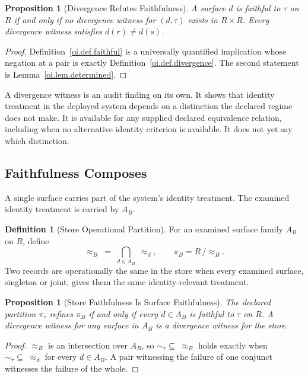 \documentclass[11pt]{article}
\theoremstyle{plain}
\newtheorem{proposition}[theorem]{Proposition}
\theoremstyle{definition}
\newtheorem{definition}[theorem]{Definition}
\theoremstyle{remark}
\newcommand{\Ker}{\ensuremath{\mathrel{\approx_{d}}}}
\begin{document}
\begin{proposition}[Divergence Refutes Faithfulness]
  \label{oi.prop.refutes}
  A surface \(d\) is faithful to \(\tau\) on \(R\)
  if and only if no divergence witness for \((d,\tau)\) exists in \(R\times R\).
  Every divergence witness satisfies \(d(r)\neq d(s)\).
\end{proposition}

\begin{proof}
  Definition~\ref{oi.def.faithful} is a universally quantified implication
  whose negation at a pair is exactly Definition~\ref{oi.def.divergence}.
  The second statement is Lemma~\ref{oi.lem.determined}.
\end{proof}

A divergence witness is an audit finding on its own.
It shows that identity treatment in the deployed system
depends on a distinction the declared regime does not make.
It is available for any supplied declared equivalence relation,
including when no alternative identity criterion is available.
It does not yet say which distinction.

\subsection{Faithfulness Composes}

A single surface carries part of the system's identity treatment.
The examined identity treatment is carried by \(A_B\).

\begin{definition}[Store Operational Partition]
  \label{oi.def.store}
  For an examined surface family \(A_B\) on \(R\), define
  \[
    \approx_{B}
    \;=\;
    \bigcap_{d\in A_B}\;\Ker,
    \qquad
    \pi_B
    =
    R\,/\approx_{B}.
  \]
  Two records are operationally the same in the store
  when every examined surface,
  singleton or joint,
  gives them the same identity-relevant treatment.
\end{definition}

\begin{proposition}[Store Faithfulness Is Surface Faithfulness]
  \label{oi.prop.compose}
  The declared partition \(\pi_{\tau}\) refines \(\pi_B\)
  if and only if every \(d\in A_B\) is faithful to \(\tau\) on \(R\).
  A divergence witness for any surface in \(A_B\)
  is a divergence witness for the store.
\end{proposition}

\begin{proof}
  \(\approx_{B}\) is an intersection over \(A_B\),
  so \(\sim_{\tau}\subseteq\;\approx_{B}\)
  holds exactly when \(\sim_{\tau}\subseteq\;\Ker\) for every \(d\in A_B\).
  A pair witnessing the failure of one conjunct witnesses the failure of the whole.
\end{proof}
\end{document}
